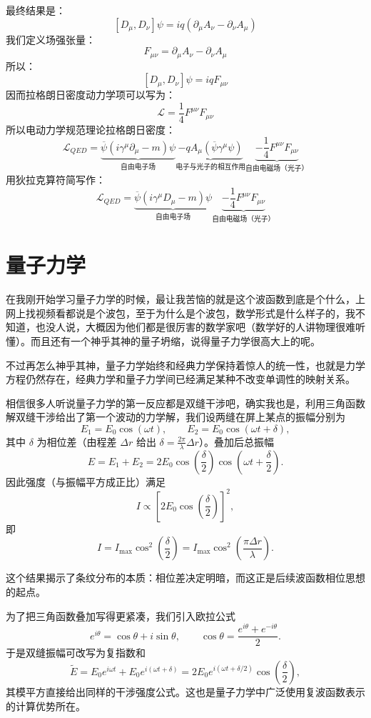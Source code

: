 \documentclass[UTF8]{ctexbook}
\begin{document}
最终结果是：
\[
\left[ D_{\mu},D_{\nu} \right]\psi=iq\left( \partial_{\mu}A_{\nu}-\partial_{\nu}A_{\mu} \right)
\]
我们定义场强张量：
\[
\boxed{F_{\mu\nu}=\partial_{\mu}A_{\nu}-\partial_{\nu}A_{\mu}}
\]
所以：
\[
\left[ D_{\mu},D_{\nu} \right]\psi=iqF_{\mu\nu}
\]
因而拉格朗日密度动力学项可以写为：
\[
\mathcal{L}=\frac{1}{4}F^{\mu\nu}F_{\mu\nu}
\]
所以电动力学规范理论拉格朗日密度：
\[
\mathcal{L}_{QED}
=\underbrace{\overline{\psi}\left( i\gamma^{\mu}\partial_{\mu}-m \right)\psi}_{\text{自由电子场}}
\underbrace{-qA_{\mu}\left( \overline{\psi}\gamma^{\mu}\psi \right)}_{\text{电子与光子的相互作用}}
\underbrace{-\frac{1}{4}F^{\mu\nu}F_{\mu\nu}}_{\text{自由电磁场（光子）}}
\]
用狄拉克算符简写作：
\[
\boxed{\mathcal{L}_{QED}
=\underbrace{\overline{\psi}\left( i\gamma^{\mu}D_{\mu}-m \right)\psi}_{\text{自由电子场}}
\underbrace{-\frac{1}{4}F^{\mu\nu}F_{\mu\nu}}_{\text{自由电磁场（光子）}}}
\]



\chapter{量子力学}

在我刚开始学习量子力学的时候，最让我苦恼的就是这个波函数到底是个什么，上网上找视频看都说是个波包，至于为什么是个波包，数学形式是什么样子的，我不知道，也没人说，大概因为他们都是很厉害的数学家吧（数学好的人讲物理很难听懂）。而且还有一个神乎其神的量子坍缩，说得量子力学很高大上的呢。

不过再怎么神乎其神，量子力学始终和经典力学保持着惊人的统一性，也就是力学方程仍然存在，经典力学和量子力学间已经满足某种不改变单调性的映射关系。

相信很多人听说量子力学的第一反应都是双缝干涉吧，确实我也是，利用三角函数解双缝干涉给出了第一个波动的力学解，我们设两缝在屏上某点的振幅分别为
\[
E_1=E_0\cos(\omega t),\qquad E_2=E_0\cos(\omega t+\delta),
\]
其中 \(\delta\) 为相位差（由程差 \(\Delta r\) 给出 \(\delta=\frac{2\pi}{\lambda}\Delta r\)）。叠加后总振幅
\[
E=E_1+E_2=2E_0\cos\left(\frac{\delta}{2}\right)\cos\left(\omega t+\frac{\delta}{2}\right).
\]
因此强度（与振幅平方成正比）满足
\[
I\propto \left[2E_0\cos\left(\frac{\delta}{2}\right)\right]^2,
\]
即
\[
I=I_{\max}\cos^2\left(\frac{\delta}{2}\right)
=I_{\max}\cos^2\left(\frac{\pi\Delta r}{\lambda}\right).
\]

这个结果揭示了条纹分布的本质：相位差决定明暗，而这正是后续波函数相位思想的起点。

为了把三角函数叠加写得更紧凑，我们引入欧拉公式
\[
e^{i\theta}=\cos\theta+i\sin\theta,
\qquad
\cos\theta=\frac{e^{i\theta}+e^{-i\theta}}{2}.
\]
于是双缝振幅可改写为复指数和
\[
\tilde E=E_0e^{i\omega t}+E_0e^{i(\omega t+\delta)}
=2E_0e^{i(\omega t+\delta/2)}\cos\left(\frac{\delta}{2}\right),
\]
其模平方直接给出同样的干涉强度公式。这也是量子力学中广泛使用复波函数表示的计算优势所在。
\end{document}

